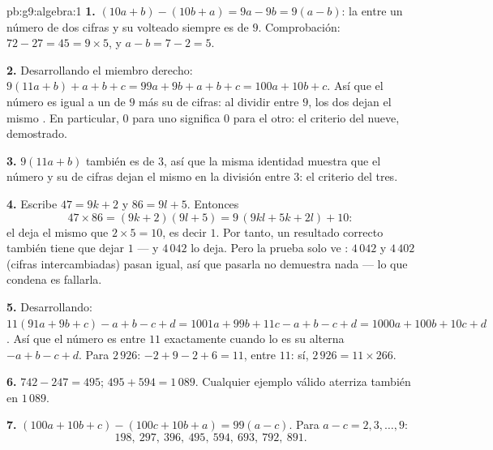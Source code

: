 \begin{solution}{pb:g9:algebra:1}
\textbf{1.} $(10a + b) - (10b + a) = 9a - 9b = 9(a - b)$: la
 entre un número de dos cifras y su volteado siempre es
 de $9$. Comprobación: $72 - 27 = 45 = 9 \times 5$, y
$a - b = 7 - 2 = 5$.

\textbf{2.} Desarrollando el miembro derecho:
$9(11a + b) + a + b + c = 99a + 9b + a + b + c
= 100a + 10b + c$. Así que el número es igual a un  de $9$ más
su  de cifras: al dividir entre $9$, los dos dejan el mismo .
En particular,  $0$ para uno significa  $0$ para el
otro: el criterio del nueve, demostrado.

\textbf{3.} $9(11a + b)$ también es  de $3$, así que la misma
identidad muestra que el número y su  de cifras dejan el mismo  en
la división entre $3$: el criterio del tres.

\textbf{4.} Escribe $47 = 9k + 2$ y $86 = 9l + 5$. Entonces
\[
47 \times 86 = (9k + 2)(9l + 5)
= 9\,(9kl + 5k + 2l) + 10 :
\]
el  deja el mismo  que $2 \times 5 = 10$,
es decir $1$. Por tanto, un resultado correcto también tiene que dejar 
$1$ --- y $4\,042$ lo deja. Pero la prueba solo ve :
$4\,042$ y $4\,402$ (cifras intercambiadas) pasan igual, así que
pasarla no demuestra nada --- lo que condena es fallarla.

\textbf{5.} Desarrollando: $11(91a + 9b + c) - a + b - c + d
= 1001a + 99b + 11c - a + b - c + d
= 1000a + 100b + 10c + d$. Así que el número es  entre $11$
exactamente cuando lo es su  alterna $-a + b - c + d$. Para
$2\,926$: $-2 + 9 - 2 + 6 = 11$,  entre $11$: sí,
$2\,926 = 11 \times 266$.

\textbf{6.} $742 - 247 = 495$; $495 + 594 = 1\,089$. Cualquier
ejemplo válido aterriza también en $1\,089$.

\textbf{7.} $(100a + 10b + c) - (100c + 10b + a) = 99(a - c)$.
Para $a - c = 2, 3, \dots, 9$:
\[
198,\ 297,\ 396,\ 495,\ 594,\ 693,\ 792,\ 891 .
\]


\end{solution}
